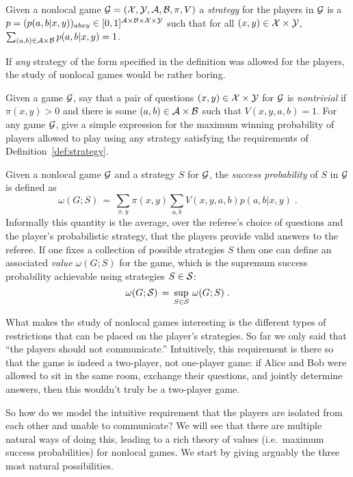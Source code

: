 \begin{definition}[Strategy]\label{def:strategy}
Given a nonlocal game $\mathcal{G}=(\mathcal{X},\mathcal{Y},\mathcal{A},\mathcal{B},\pi,V)$ a \emph{strategy} for the players in $\mathcal{G}$ is a $p=(p(a,b|x,y))_{abxy} \in [0,1]^{\mathcal{A}\times \mathcal{B}\times \mathcal{X}\times \mathcal{Y}}$ such that for all $(x,y)\in\mathcal{X}\times \mathcal{Y}$, $\sum_{(a,b)\in\mathcal{A}\times \mathcal{B}} p(a,b|x,y) = 1$. 
\end{definition}

If \emph{any} strategy of the form specified in the definition was allowed for the players, the study of nonlocal games would be rather boring. 

\begin{exercise}\label{ex:nontrivial}
Given a game $\mathcal{G}$, say that a pair of questions $(x,y)\in\mathcal{X}\times \mathcal{Y}$ for $\mathcal{G}$ is \emph{nontrivial} if $\pi(x,y)>0$ and there is some $(a,b)\in \mathcal{A}\times \mathcal{B}$ such that $V(x,y,a,b)=1$.
For any game $\mathcal{G}$, give a simple expression for the maximum winning probability of players allowed to play using any strategy satisfying the requirements of Definition~\ref{def:strategy}.
\end{exercise}

Given a nonlocal game $\mathcal{G}$ and a strategy $S$ for $\mathcal{G}$, the \emph{success probability} of $S$ in $\mathcal{G}$ is defined as 
\[ \omega(G;S) \,=\, \sum_{x,y} \pi(x,y) \sum_{a,b} V(x,y,a,b) p(a,b|x,y)\;.\]
Informally this quantity is the average, over the referee's choice of questions and the player's probabilistic strategy, that the players provide valid answers to the referee. 
If one fixes a collection of possible strategies $S$ then one can define an associated \emph{value} $\omega(G;S)$ for the game, which is the supremum success probability achievable using strategies $S\in\mathcal{S}$:
\[ \omega(G;\mathcal{S}) \,=\, \sup_{S\in\mathcal{S}} \,\omega(G;S)\;.\]





What makes the study of nonlocal games interesting is the different types of restrictions that can be placed on the player's strategies. So far we only said that ``the players should not communicate.'' Intuitively, this requirement is there so that the game is indeed a two-player, not one-player game: if Alice and Bob were allowed to sit in the same room, exchange their questions, and jointly determine answers, then this wouldn't truly be a two-player game. 

So how do we model the intuitive requirement that  the players are isolated from each other and unable to communicate?
We will see that there are multiple natural ways of doing this, leading to a rich theory of values (i.e.\ maximum success probabilities) for nonlocal games. We start by giving arguably the three most natural possibilities.

